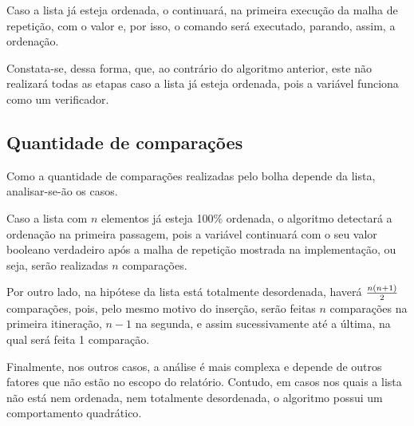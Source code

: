 Caso a lista já esteja ordenada, o  continuará, na primeira execução da malha de repetição, com o valor  e, por isso, o comando  será executado, parando, assim, a ordenação.

Constata-se, dessa forma, que, ao contrário do algoritmo anterior, este não realizará todas as etapas caso a lista já esteja ordenada, pois a variável  funciona como um verificador.

\subsection{Quantidade de comparações}
Como a quantidade de comparações realizadas pelo bolha depende da lista, analisar-se-ão os casos. 

Caso a lista com $n$ elementos já esteja 100\% ordenada, o algoritmo detectará a ordenação na primeira passagem, pois a variável  continuará com o seu valor booleano verdadeiro após a malha de repetição mostrada na implementação, ou seja, serão realizadas $n$ comparações.

Por outro lado, na hipótese da lista está totalmente desordenada, haverá $n(n+1)\over 2$ comparações, pois, pelo mesmo motivo do inserção, serão feitas $n$ comparações na primeira itineração, $n-1$ na segunda, e assim sucessivamente até a última, na qual será feita 1 comparação.

Finalmente, nos outros casos, a análise é mais complexa e depende de outros fatores que não estão no escopo do relatório. Contudo, em casos nos quais a lista não está nem ordenada, nem totalmente desordenada, o algoritmo possui um comportamento quadrático\cite{bubblecomplexity}.